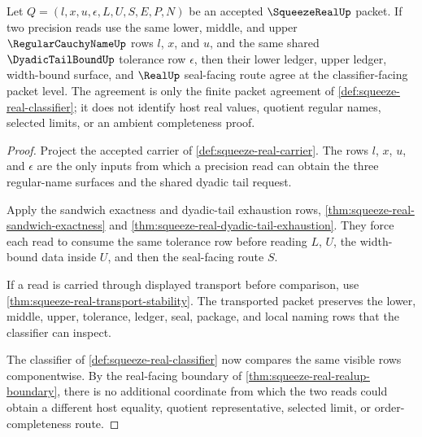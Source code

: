 \begin{theorem}
\label{thm:squeeze-real-shared-tail-ledger-determinacy}
Let $Q=(l,x,u,\epsilon,L,U,S,E,P,N)$ be an accepted $\SqueezeRealUp$ packet. If two precision reads use the same lower, middle, and upper $\RegularCauchyNameUp$ rows $l$, $x$, and $u$, and the same shared $\DyadicTailBoundUp$ tolerance row $\epsilon$, then their lower ledger, upper ledger, width-bound surface, and $\RealUp$ seal-facing route agree at the classifier-facing packet level. The agreement is only the finite packet agreement of \autoref{def:squeeze-real-classifier}; it does not identify host real values, quotient regular names, selected limits, or an ambient completeness proof.
\end{theorem}
\begin{proof}
Project the accepted carrier of \autoref{def:squeeze-real-carrier}. The rows $l$, $x$, $u$, and $\epsilon$ are the only inputs from which a precision read can obtain the three regular-name surfaces and the shared dyadic tail request.

Apply the sandwich exactness and dyadic-tail exhaustion rows, \autoref{thm:squeeze-real-sandwich-exactness} and \autoref{thm:squeeze-real-dyadic-tail-exhaustion}. They force each read to consume the same tolerance row before reading $L$, $U$, the width-bound data inside $U$, and then the seal-facing route $S$.

If a read is carried through displayed transport before comparison, use \autoref{thm:squeeze-real-transport-stability}. The transported packet preserves the lower, middle, upper, tolerance, ledger, seal, package, and local naming rows that the classifier can inspect.

The classifier of \autoref{def:squeeze-real-classifier} now compares the same visible rows componentwise. By the real-facing boundary of \autoref{thm:squeeze-real-realup-boundary}, there is no additional coordinate from which the two reads could obtain a different host equality, quotient representative, selected limit, or order-completeness route.
\end{proof}

